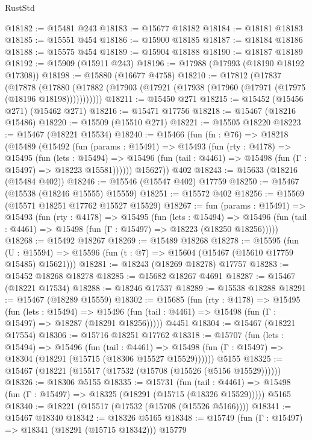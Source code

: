 \begin{lexlean}{RustStd}
\begin{coremodule}
@18182 := @15481 @243
@18183 := @15677 @18182
@18184 := @18181 @18183
@18185 := @15551 @454
@18186 := @15900 @18185
@18187 := @18184 @18186
@18188 := @15575 @454
@18189 := @15904 @18188
@18190 := @18187 @18189
@18192 := @15909 (@15911 @243)
@18196 := @17988 (@17993 (@18190 @18192 @17308))
@18198 := @15880 (@16677 @4758)
@18210 := @17812
    (@17837
      (@17878
        (@17880 (@17882 (@17903 (@17921 (@17938 (@17960 (@17971 (@17975 (@18196 @18198)))))))))))
@18211 := @15450 @271
@18215 := @15452 (@15456 @271) (@15462 @271)
@18216 := @15471 @17756
@18218 := @15467 (@18216 @15486)
@18220 := @15509 (@15510 @271)
@18221 := @15505 @18220
@18223 := @15467 (@18221 @15534)
@18240 := @15466
    (fun (fn : @76) =>
    @18218
      (@15489
        (@15492
          (fun (params : @15491) =>
          @15493
            (fun (rty : @4178) =>
            @15495
              (fun (lets : @15494) =>
              @15496 (fun (tail : @4461) => @15498 (fun (Γ : @15497) => @18223 @15581))))))
        @15627))
    @402
@18243 := @15633 (@18216 (@15484 @402))
@18246 := @15546 (@15547 @402) @17759
@18250 := @15467 (@15538 (@18246 @15555) @15559)
@18251 := @15572 @402
@18256 := @15569 (@15571 @18251 @17762 @15527 @15529)
@18267 := fun (params : @15491) =>
  @15493
    (fun (rty : @4178) =>
    @15495
      (fun (lets : @15494) =>
      @15496 (fun (tail : @4461) => @15498 (fun (Γ : @15497) => @18223 (@18250 @18256)))))
@18268 := @15492 @18267
@18269 := @15489 @18268
@18278 := @15595
    (fun (U : @15594) => @15596 (fun (t : @7) => @15604 (@15467 (@15610 @17759 @15485) @15621)))
@18281 := @18243 (@18269 @18278) @17757
@18283 := @15452 @18268 @18278
@18285 := @15682 @18267 @4691
@18287 := @15467 (@18221 @17534)
@18288 := @18246 @17537
@18289 := @15538 @18288
@18291 := @15467 (@18289 @15559)
@18302 := @15685
    (fun (rty : @4178) =>
    @15495
      (fun (lets : @15494) =>
      @15496 (fun (tail : @4461) => @15498 (fun (Γ : @15497) => @18287 (@18291 @18256)))))
    @4451
@18304 := @15467 (@18221 @17554)
@18306 := @15716 @18251 @17762
@18318 := @15707
    (fun (lets : @15494) =>
    @15496
      (fun (tail : @4461) =>
      @15498 (fun (Γ : @15497) => @18304 (@18291 (@15715 (@18306 @15527 @15529))))))
    @5155
@18325 := @15467 (@18221 (@15517 (@17532 (@15708 (@15526 (@5156 @15529))))))
@18326 := @18306 @5155
@18335 := @15731
    (fun (tail : @4461) => @15498 (fun (Γ : @15497) => @18325 (@18291 (@15715 (@18326 @15529)))))
    @5165
@18340 := @18221 (@15517 (@17532 (@15708 (@15526 @5166))))
@18341 := @15467 @18340
@18342 := @18326 @5165
@18348 := @15749 (fun (Γ : @15497) => @18341 (@18291 (@15715 @18342))) @15779

\end{coremodule}
\end{lexlean}
